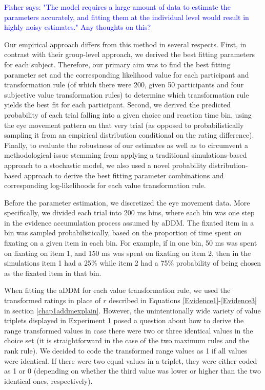 \documentclass[11pt,a4paper]{article}
\newcommand{\AT}[1] {{\textcolor{blue}{#1}}}
\begin{document}
\AT{Fisher says: "The model requires a large amount of data to estimate the parameters accurately, and fitting them at the individual level would result in highly noisy estimates." Any thoughts on this?}

Our empirical approach differs from this method in several respects. First, in contrast with their group-level approach, we derived the best fitting parameters for each subject. Therefore, our primary aim was to find the best fitting parameter set and the corresponding likelihood value for each participant and transformation rule (of which there were 200, given 50 participants and four subjective value transformation rules) to determine which transformation rule yields the best fit for each participant. Second, we derived the predicted probability of each trial falling into a given choice and reaction time bin, using the eye movement pattern on that very trial (as opposed to probabilistically sampling it from an empirical distribution conditional on the rating difference). Finally, to evaluate the robustness of our estimates as well as to circumvent a methodological issue stemming from applying a traditional simulations-based approach to a stochastic model, we also used a novel probability distribution-based approach to derive the best fitting parameter combinations and corresponding log-likelihoods for each value transformation rule.

Before the parameter estimation, we discretized the eye movement data. More specifically, we divided each trial into 200 ms bins, where each bin was one step in the evidence accumulation process assumed by aDDM. The fixated item in a bin was sampled probabilistically, based on the proportion of time spent on fixating on a given item in each bin. For example, if in one bin, 50 ms was spent on fixating on item 1, and 150 ms was spent on fixating on item 2, then in the simulations item 1 had a 25\% while item 2 had a 75\% probability of being chosen as the fixated item in that bin. 

When fitting the aDDM for each value transformation rule, we used the transformed ratings in place of $r$ described in Equations \ref{Evidence1}-\ref{Evidence3} in section \ref{chap1addmexplain}. However, the unintentionally wide variety of value triplets displayed in Experiment 1 posed a question about how to derive the range transformed values in case there were two or three identical values in the choice set (it is straightforward in the case of the two maximum rules and the rank rule). We decided to code the transformed range values as 1 if all values were identical. If there were two equal values in a triplet, they were either coded as 1 or 0 (depending on whether the third value was lower or higher than the two identical ones, respectively). 
\end{document}
